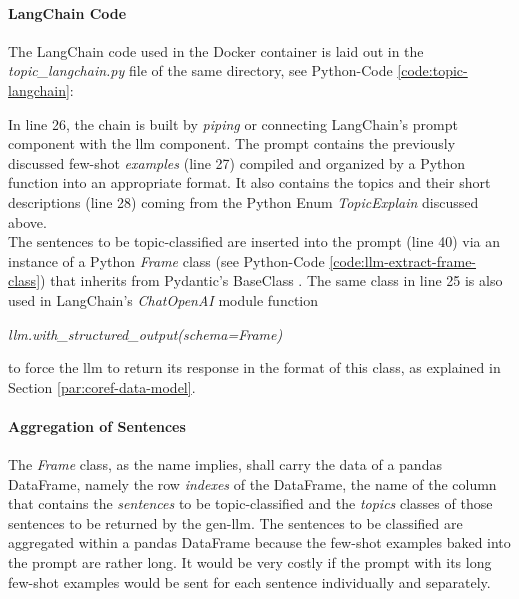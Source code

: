\paragraph{LangChain Code}
The LangChain code used in the Docker container is laid out in the \emph{topic\_langchain.py} file of the same directory, see Python-Code \ref{code:topic-langchain}:

In line 26, the chain is built by \emph{piping} or connecting LangChain's \gls{prompt} component with the \gls{llm} component.
The \gls{prompt} contains the previously discussed few-shot \emph{examples} (line 27) compiled and organized by a Python function into an appropriate format.
It also contains the topics and their short descriptions (line 28) coming from the Python Enum \emph{TopicExplain} discussed above.\\

The sentences to be topic-classified are inserted into the \gls{prompt} (line 40) via an instance of a Python \emph{Frame} class (see Python-Code \ref{code:llm-extract-frame-class}) that inherits from Pydantic's BaseClass \cite{Pydantic}.
The same class in line 25 is also used in LangChain's \emph{ChatOpenAI} module function
\begin{center}
    \emph{llm.with\_structured\_output(schema=Frame)}
\end{center}
to force the \gls{llm} to return its response in the format of this class, as explained in Section \ref{par:coref-data-model}.


\paragraph{Aggregation of Sentences}
The \emph{Frame} class, as the name implies, shall carry the data of a pandas DataFrame, namely the row \emph{indexes} of the DataFrame, the name of the column that contains the \emph{sentences} to be topic-classified and the \emph{topics} classes of those sentences to be returned by the \gls{gen-llm}.
The sentences to be classified are aggregated within a pandas DataFrame because the few-shot examples baked into the \gls{prompt} are rather long.
It would be very costly if the \gls{prompt} with its long few-shot examples would be sent for each sentence individually and separately.

